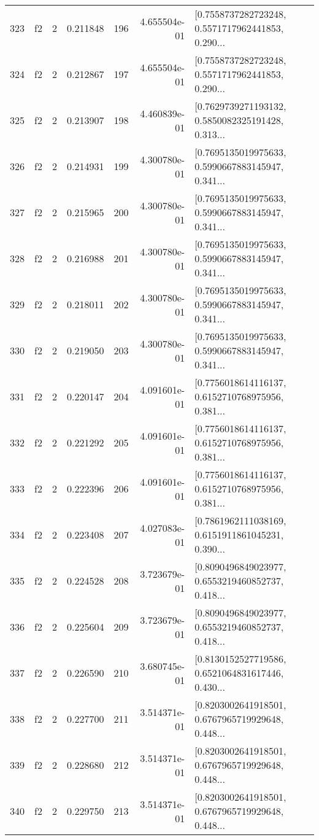 \begin{tabular}{lllrlrl}
323 &  f2 &   2 &  0.211848 &  196 &  4.655504e-01 &  [0.7558737282723248, 0.5571717962441853, 0.290... \\
324 &  f2 &   2 &  0.212867 &  197 &  4.655504e-01 &  [0.7558737282723248, 0.5571717962441853, 0.290... \\
325 &  f2 &   2 &  0.213907 &  198 &  4.460839e-01 &  [0.7629739271193132, 0.5850082325191428, 0.313... \\
326 &  f2 &   2 &  0.214931 &  199 &  4.300780e-01 &  [0.7695135019975633, 0.5990667883145947, 0.341... \\
327 &  f2 &   2 &  0.215965 &  200 &  4.300780e-01 &  [0.7695135019975633, 0.5990667883145947, 0.341... \\
328 &  f2 &   2 &  0.216988 &  201 &  4.300780e-01 &  [0.7695135019975633, 0.5990667883145947, 0.341... \\
329 &  f2 &   2 &  0.218011 &  202 &  4.300780e-01 &  [0.7695135019975633, 0.5990667883145947, 0.341... \\
330 &  f2 &   2 &  0.219050 &  203 &  4.300780e-01 &  [0.7695135019975633, 0.5990667883145947, 0.341... \\
331 &  f2 &   2 &  0.220147 &  204 &  4.091601e-01 &  [0.7756018614116137, 0.6152710768975956, 0.381... \\
332 &  f2 &   2 &  0.221292 &  205 &  4.091601e-01 &  [0.7756018614116137, 0.6152710768975956, 0.381... \\
333 &  f2 &   2 &  0.222396 &  206 &  4.091601e-01 &  [0.7756018614116137, 0.6152710768975956, 0.381... \\
334 &  f2 &   2 &  0.223408 &  207 &  4.027083e-01 &  [0.7861962111038169, 0.6151911861045231, 0.390... \\
335 &  f2 &   2 &  0.224528 &  208 &  3.723679e-01 &  [0.8090496849023977, 0.6553219460852737, 0.418... \\
336 &  f2 &   2 &  0.225604 &  209 &  3.723679e-01 &  [0.8090496849023977, 0.6553219460852737, 0.418... \\
337 &  f2 &   2 &  0.226590 &  210 &  3.680745e-01 &  [0.8130152527719586, 0.6521064831617446, 0.430... \\
338 &  f2 &   2 &  0.227700 &  211 &  3.514371e-01 &  [0.8203002641918501, 0.6767965719929648, 0.448... \\
339 &  f2 &   2 &  0.228680 &  212 &  3.514371e-01 &  [0.8203002641918501, 0.6767965719929648, 0.448... \\
340 &  f2 &   2 &  0.229750 &  213 &  3.514371e-01 &  [0.8203002641918501, 0.6767965719929648, 0.448... \\

\end{tabular}
